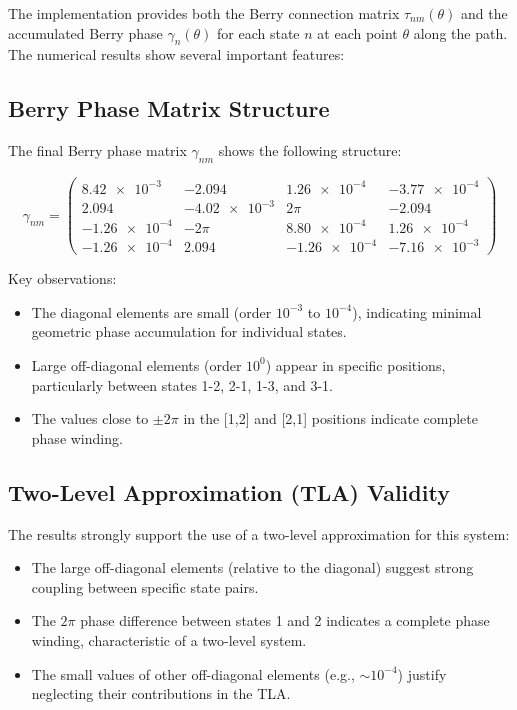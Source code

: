 \documentclass{article}
\begin{document}
The implementation provides both the Berry connection matrix $\tau_{nm}(\theta)$ and the accumulated Berry phase $\gamma_n(\theta)$ for each state $n$ at each point $\theta$ along the path. The numerical results show several important features:

\subsection{Berry Phase Matrix Structure}
The final Berry phase matrix $\gamma_{nm}$ shows the following structure:

\begin{equation}
\gamma_{nm} = 
\begin{pmatrix}
\num{8.42e-3} & -2.094 & \num{1.26e-4} & \num{-3.77e-4} \\
2.094 & \num{-4.02e-3} & 2\pi & -2.094 \\
\num{-1.26e-4} & -2\pi & \num{8.80e-4} & \num{1.26e-4} \\
\num{-1.26e-4} & 2.094 & \num{-1.26e-4} & \num{-7.16e-3}
\end{pmatrix}
\end{equation}

Key observations:
\begin{itemize}
    \item The diagonal elements are small (order $10^{-3}$ to $10^{-4}$), indicating minimal geometric phase accumulation for individual states.
    \item Large off-diagonal elements (order $10^0$) appear in specific positions, particularly between states 1-2, 2-1, 1-3, and 3-1.
    \item The values close to $\pm 2\pi$ in the [1,2] and [2,1] positions indicate complete phase winding.
\end{itemize}

\subsection{Two-Level Approximation (TLA) Validity}
The results strongly support the use of a two-level approximation for this system:

\begin{itemize}
    \item The large off-diagonal elements (relative to the diagonal) suggest strong coupling between specific state pairs.
    \item The $2\pi$ phase difference between states 1 and 2 indicates a complete phase winding, characteristic of a two-level system.
    \item The small values of other off-diagonal elements (e.g., $\sim 10^{-4}$) justify neglecting their contributions in the TLA.
\end{itemize}
\end{document}
